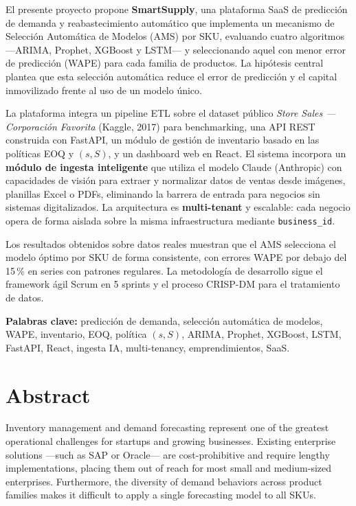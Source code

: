 \documentclass[12pt, a4paper]{report}
\begin{document}
El presente proyecto propone \textbf{SmartSupply}, una plataforma SaaS de predicción de
demanda y reabastecimiento automático que implementa un mecanismo de Selección
Automática de Modelos (AMS) por SKU, evaluando cuatro algoritmos —ARIMA, Prophet,
XGBoost y LSTM— y seleccionando aquel con menor error de predicción (WAPE) para
cada familia de productos. La hipótesis central plantea que esta selección automática
reduce el error de predicción y el capital inmovilizado frente al uso de un modelo único.

La plataforma integra un pipeline ETL sobre el dataset público \textit{Store Sales — Corporación
Favorita} (Kaggle, 2017) para benchmarking, una API REST construida con FastAPI, un módulo
de gestión de inventario basado en las políticas EOQ y $(s,S)$, y un dashboard web en React.
El sistema incorpora un \textbf{módulo de ingesta inteligente} que utiliza el modelo Claude
(Anthropic) con capacidades de visión para extraer y normalizar datos de ventas desde
imágenes, planillas Excel o PDFs, eliminando la barrera de entrada para negocios sin
sistemas digitalizados. La arquitectura es \textbf{multi-tenant} y escalable: cada negocio
opera de forma aislada sobre la misma infraestructura mediante \texttt{business\_id}.

Los resultados obtenidos sobre datos reales muestran que el AMS selecciona el modelo
óptimo por SKU de forma consistente, con errores WAPE por debajo del 15\,\% en series con
patrones regulares. La metodología de desarrollo sigue el framework ágil Scrum en 5
sprints y el proceso CRISP-DM para el tratamiento de datos.

\textbf{Palabras clave:} predicción de demanda, selección automática de modelos, WAPE,
inventario, EOQ, política $(s,S)$, ARIMA, Prophet, XGBoost, LSTM, FastAPI, React,
ingesta IA, multi-tenancy, emprendimientos, SaaS.

\newpage

\chapter*{Abstract}

Inventory management and demand forecasting represent one of the greatest operational
challenges for startups and growing businesses. Existing enterprise solutions —such as SAP
or Oracle— are cost-prohibitive and require lengthy implementations, placing them out of
reach for most small and medium-sized enterprises. Furthermore, the diversity of demand
behaviors across product families makes it difficult to apply a single forecasting model
to all SKUs.
\end{document}

